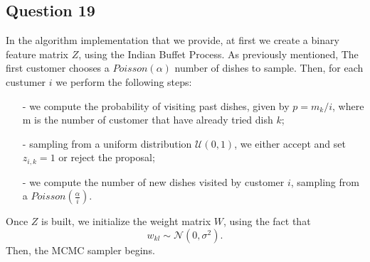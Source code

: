 \documentclass[]{article}
\begin{document}
	\subsection*{Question 19}
	In the algorithm implementation that we provide, at first we create a binary feature matrix $Z$, using the Indian Buffet Process. As previously mentioned, The first customer chooses a $Poisson(\alpha)$ number of dishes to sample. Then, for each custumer $i$ we perform the following steps:
	\begin{enumerate}
		\item [-] we compute the probability of visiting past dishes, given by $p = m_k/i$, where m is the number of customer that have already tried dish $k$;
		\item[-] sampling from a uniform distribution $\mathcal{U}(0,1)$, we either accept and set $z_{i,k}=1$ or reject the proposal;
		\item[-] we compute the number of new dishes visited by customer $i$, sampling from a $Poisson(\frac{\alpha}{i})$.
	\end{enumerate}
	Once $Z$ is built, we initialize the weight matrix $W$, using the fact that
	$$
	w_{kl} \sim \mathcal{N}(0,\sigma^2).
	$$
	Then, the MCMC sampler begins.
\end{document}
